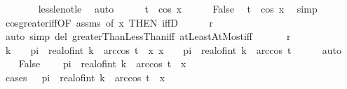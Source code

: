 \begin{isabellebody}
\ \ \ \ \ \ \isamarkupfalse%
\ less{\isacharunderscore}{\kern0pt}le{\isacharunderscore}{\kern0pt}not{\isacharunderscore}{\kern0pt}le\ \isamarkupfalse%
\ auto\isanewline
\ \ \ \ \isamarkupfalse%
\ {\isachardoublequoteopen}t\ {\isasymle}\ cos\ x{\isachardoublequoteclose}\isanewline
\ \ \ \ \isamarkupfalse%
\ False\ \isamarkupfalse%
\ {\isachardoublequoteopen}t\ {\isacharless}{\kern0pt}\ cos\ x{\isachardoublequoteclose}\ \isamarkupfalse%
\ simp\isanewline
\ \ \ \ \isamarkupfalse%
\ cos{\isacharunderscore}{\kern0pt}greater{\isacharunderscore}{\kern0pt}iff{\isacharbrackleft}{\kern0pt}OF\ assms{\isacharcomma}{\kern0pt}\ of\ x{\isacharcomma}{\kern0pt}\ THEN\ iffD{}{\isacharbrackright}{\kern0pt}\isanewline
\ \ \ \ \isamarkupfalse%
\ {\isacharquery}{\kern0pt}r\ \isamarkupfalse%
\ {\isacharparenleft}{\kern0pt}auto\ simp\ del{\isacharcolon}{\kern0pt}\ greaterThanLessThan{\isacharunderscore}{\kern0pt}iff\ atLeastAtMost{\isacharunderscore}{\kern0pt}iff{\isacharparenright}{\kern0pt}\isanewline
\ \ \isakeywordONE{{\isacharbraceright}{\kern0pt}}\isamarkupfalse%
\isanewline
\ \ \isamarkupfalse%
\ {\isacharquery}{\kern0pt}r\isanewline
\ \ \isamarkupfalse%
\ \isamarkupfalse%
\ k\ \ {\isachardoublequoteopen}{}\ {\isacharasterisk}{\kern0pt}\ pi\ {\isacharasterisk}{\kern0pt}\ real{\isacharunderscore}{\kern0pt}of{\isacharunderscore}{\kern0pt}int\ k\ {\isacharminus}{\kern0pt}\ arccos\ t\ {\isasymle}\ x{\isachardoublequoteclose}\ {\isachardoublequoteopen}x\ {\isasymle}\ {}\ {\isacharasterisk}{\kern0pt}\ pi\ {\isacharasterisk}{\kern0pt}\ real{\isacharunderscore}{\kern0pt}of{\isacharunderscore}{\kern0pt}int\ k\ {\isacharplus}{\kern0pt}\ arccos\ t{\isachardoublequoteclose}\isanewline
\ \ \ \ \isamarkupfalse%
\ auto\isanewline
\ \ \isamarkupfalse%
\ False\ \isamarkupfalse%
\ {\isachardoublequoteopen}{}\ {\isacharasterisk}{\kern0pt}\ pi\ {\isacharasterisk}{\kern0pt}\ real{\isacharunderscore}{\kern0pt}of{\isacharunderscore}{\kern0pt}int\ k\ {\isacharminus}{\kern0pt}\ arccos\ t\ {\isacharless}{\kern0pt}\ x{\isachardoublequoteclose}\isanewline
\ \ \ \ \isamarkupfalse%
\ {\isacharparenleft}{\kern0pt}cases\ {\isachardoublequoteopen}{}\ {\isacharasterisk}{\kern0pt}\ pi\ {\isacharasterisk}{\kern0pt}\ real{\isacharunderscore}{\kern0pt}of{\isacharunderscore}{\kern0pt}int\ k\ {\isacharminus}{\kern0pt}\ arccos\ t\ {\isacharequal}{\kern0pt}\ x{\isachardoublequoteclose}{\isacharparenright}{\kern0pt}\isanewline

\end{isabellebody}
